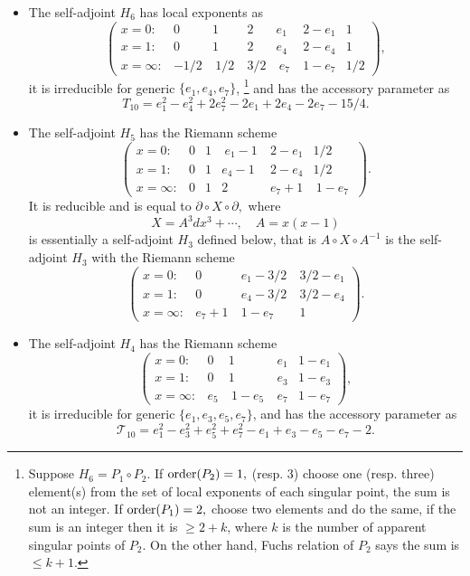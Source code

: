 \documentclass[a4paper,12pt]{article}
\theoremstyle{definition}
\theoremstyle{remark}
\numberwithin{equation}{section} %
\def\comment#1{ }
\begin{document}
\begin {itemize}

\item The self-adjoint $H_6$ has local exponents as 
\[\left(\begin{array}{ccccccc}
 x=0:&0&1&2&e_1&2-e_1&1\\ x=1:& 0&1&2&e_4&2-e_4&1\\ x=\infty:&-1/2&\ 1/2\ &3/2&\ e_7\ &1-e_7&1/2\end{array}\right),\]
it is irreducible for generic $\{e_1,e_4,e_7\}$, 
\footnote{Suppose $H_6=P_1\circ P_2$. If ${\rm order}(P_2)=1,$ (resp. 3) choose one (resp. three) element(s) from the set of local exponents of each singular point, the sum is not an integer.
If ${\rm order}(P_1)=2,$ choose two elements and do the same, if the sum is an integer then it is  $\ge2+k$, where $k$ is the number of apparent singular points of $P_2$. On the other hand,
Fuchs relation of $P_2$ says the sum is $\le k+1$.}
and has the accessory parameter as
$$T_{10} = e_1^2 - e_4^2 + 2 e_7^2 - 2 e_1 + 2 e_4 - 2 e_7 - 15/4.$$

\item The self-adjoint $H_5$ has the Riemann scheme 
\[\left(\begin{array}{cccccc}
 x=0:&0&1&\ e_1-1\ &2-e_1&1/2\\ x=1:& 0&1&e_4-1&2-e_4&1/2\\  x=\infty:&0&1&2&e_7+1&\ 1-e_7\ \end{array}\right).\]
It is reducible and is equal to $\partial\circ X\circ\partial,$ where 
$$X=A^3dx^3+\cdots, \quad A=x(x-1)$$ is essentially a self-adjoint $H_3$ defined below, that is 
 $A\circ X\circ A^{-1}$ is the self-adjoint $H_3$ with the Riemann scheme
\[\left(\begin{array}{cccc}
 x=0:&0&\ e_1-3/2\ &3/2-e_1\\ x=1:& 0&\ e_4-3/2\ &3/2-e_4 \\  x=\infty:&e_7+1&\ 1-e_7\ &1\end{array}\right).\]

\item  The self-adjoint $H_4$ has the Riemann scheme 
\[\left(\begin{array}{ccccc}
 x=0:&0&1&e_1&1-e_1\\  x=1:&0&1&e_3&1-e_3\\  x=\infty:&e_5&\ 1-e_5\ &e_7&1-e_7\end{array}\right), \]
it is irreducible for generic $\{e_1,e_3,e_5,e_7\}$, and has the accessory parameter as
$$\mathcal T_{10}=e_1^2 - e_3^2 + e_5^2 + e_7^2 - e_1 + e_3 - e_5 - e_7 - 2.$$
\comment{ T0:=mult((z+c5),(z+c6),(z+c7),(z+c8),[dx,x]):
     T1:=-2*mult(z,z,z,[dx,x])+ T12*mult(z,z,[dx,x])+ T11* z+ T10:
     T12:=c1+c2-c5-c6-c7-c8-5:
     T11:=3 (c1+c2)-c1 c2+c3 c4-c5 c6-c5 c7-c5 c8-c6 c7-c6 c8-c7 c8-8:
     T2:=mult((z-c1+2),(z-c2+2),[dx,x]):}


\end{itemize}
\end{document}
